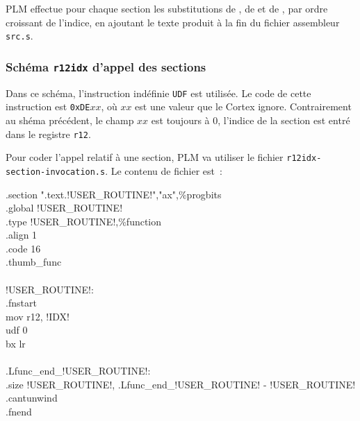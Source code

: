 PLM effectue pour chaque section les substitutions de , de  et de , par ordre croissant de l'indice, en ajoutant le texte produit à la fin du fichier assembleur \texttt{src.s}.










\subsubsection{Schéma \texttt{r12idx} d'appel des sections}

Dans ce schéma, l'instruction indéfinie \texttt{UDF} est utilisée.  Le code de cette instruction est \texttt{0xDE$xx$}, où $xx$ est une valeur que le Cortex ignore. Contrairement au shéma précédent, le champ $xx$ est toujours à $0$, l'indice de la section est entré dans le registre \texttt{r12}.

Pour coder l'appel relatif à une section, PLM va utiliser le fichier \texttt{r12idx-section-invocation.s}. Le contenu de fichier est~:
\begin{SHELL}\small
\hspace*{1.2em}.section  ".text.!USER\_ROUTINE!","ax",\%progbits\\
\hspace*{1.2em}.global !USER\_ROUTINE!\\
\hspace*{1.2em}.type  !USER\_ROUTINE!,\%function\\
\hspace*{1.2em}.align  1\\
\hspace*{1.2em}.code  16\\
\hspace*{1.2em}.thumb\_func\\
\\
!USER\_ROUTINE!:\\
\hspace*{1.2em}.fnstart\\
\hspace*{1.2em}mov r12, !IDX!\\
\hspace*{1.2em}udf 0\\
\hspace*{1.2em}bx  lr\\
\\
.Lfunc\_end\_!USER\_ROUTINE!:\\
\hspace*{1.2em}.size  !USER\_ROUTINE!, .Lfunc\_end\_!USER\_ROUTINE! - !USER\_ROUTINE!\\
\hspace*{1.2em}.cantunwind\\
\hspace*{1.2em}.fnend
\end{SHELL}

